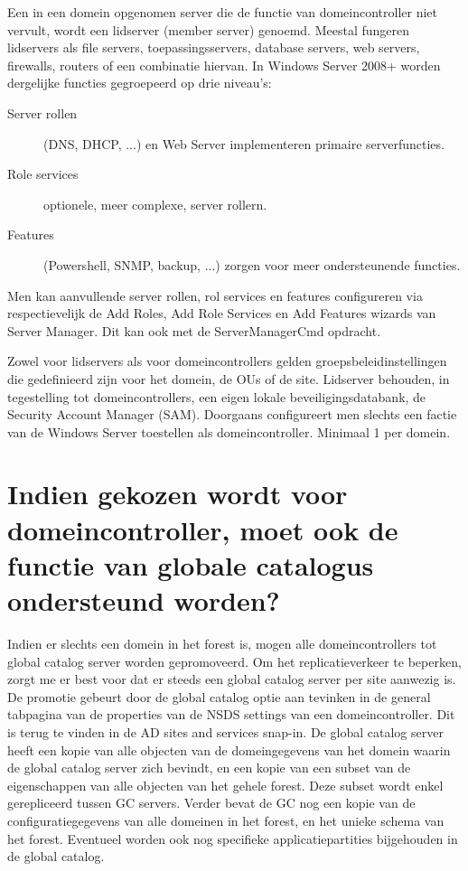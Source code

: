 Een in een domein opgenomen server die de functie van domeincontroller niet
vervult, wordt een lidserver (member server) genoemd. Meestal fungeren
lidservers als file servers, toepassingsservers, database servers, web servers,
firewalls, routers of een combinatie hiervan. In Windows Server 2008+ worden
dergelijke functies gegroepeerd op drie niveau's:
\begin{description}
	\item[Server rollen] (DNS, DHCP, ...) en Web Server implementeren
		primaire serverfuncties.
	\item[Role services] optionele, meer complexe, server rollern.
	\item[Features] (Powershell, SNMP, backup, ...) zorgen voor meer
		ondersteunende functies.
\end{description}
Men kan aanvullende server rollen, rol services en features configureren via
respectievelijk de Add Roles, Add Role Services en Add Features wizards van
Server Manager. Dit kan ook met de ServerManagerCmd opdracht.

Zowel voor lidservers als voor domeincontrollers gelden groepsbeleidinstellingen
die gedefinieerd zijn voor het domein, de OUs of de site. Lidserver behouden, in
tegestelling tot domeincontrollers, een eigen lokale beveiligingsdatabank, de
Security Account Manager (SAM).
Doorgaans configureert men slechts een factie van de Windows Server toestellen
als domeincontroller. Minimaal 1 per domein.

\section{Indien gekozen wordt voor domeincontroller, moet ook de functie van
globale catalogus ondersteund worden?}

Indien er slechts een domein in het forest is, mogen alle domeincontrollers tot
global catalog server worden gepromoveerd. Om het replicatieverkeer te beperken,
zorgt me er best voor dat er steeds een global catalog server per site aanwezig
is. De promotie gebeurt door de global catalog optie aan tevinken in de general
tabpagina van de properties van de NSDS settings van een domeincontroller. Dit
is terug te vinden in de AD sites and services snap-in. De global catalog server
heeft een kopie van alle objecten van de domeingegevens van het domein waarin de
global catalog server zich bevindt, en een kopie van een subset van de
eigenschappen van alle objecten van het gehele forest. Deze subset wordt enkel
gerepliceerd tussen GC servers. Verder bevat de GC nog een kopie van de
configuratiegegevens van alle domeinen in het forest, en het unieke schema van
het forest. Eventueel worden ook nog specifieke applicatiepartities bijgehouden
in de global catalog.

